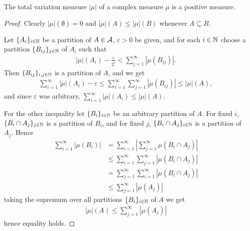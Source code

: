 \documentclass[../../main.tex]{subfiles}
\begin{document}
\begin{theorem}
The total variation measure $|\mu|$ of a complex measure $\mu$ is a positive measure.
\end{theorem}
\begin{proof}
Clearly $|\mu|(\emptyset)=0$ and $|\mu|(A) \le |\mu|(B)$ whenever $A\subseteq B$.

Let $\{A_{i}\}_{i\in \mathbb{N}}$ be a partition of $A\in \mathcal{A}$, $\varepsilon>0$ be given, and for each $i\in \mathbb{N}$ choose a partition $\{B_{ij}\}_{j \in \mathbb{N}}$ of $A_{i}$ such that
\begin{align*}
	|\mu|(A_{i}) - \frac{\varepsilon}{2^{i}} < \sum_{j=1}^{\infty} | \mu(B_{ij}) |.
\end{align*}
Then $\{B_{ij}\}_{i,j\in \mathbb{N}}$ is a partition of $A$, and we get
\begin{align*}
	\sum_{i=1}^{\infty} |\mu|(A_{i}) - \varepsilon \le \sum_{i=1}^{\infty}\sum_{j=1}^{\infty} | \mu(B_{ij}) | \le |\mu|(A),
\end{align*}
and since $\varepsilon$ was arbitrary, $\sum_{i=1}^{\infty} |\mu|(A_{i}) \le |\mu|(A)$.

For the other inequality let $\{B_{i}\}_{i\in \mathbb{N}}$ be an arbitrary partition of $A$. For fixed $i$, $\{B_{i} \cap A_{j}\}_{j\in \mathbb{N}}$ is a partition of $B_{i}$, and for fixed $j$, $\{B_{i} \cap A_{j}\}_{i\in \mathbb{N}}$ is a partition of $A_{j}$. Hence
\begin{align*}
	\sum_{i=1}^{\infty}|\mu(B_{i})| &= \sum_{i=1}^{\infty} \left| \sum_{j=1}^{\infty} \mu(B_{i} \cap A_{j}) \right|\\
	&\le \sum_{i=1}^{\infty} \sum_{j=1}^{\infty} | \mu(B_{i} \cap A_{j}) | \\
	&= \sum_{j=1}^{\infty} \sum_{i=1}^{\infty} | \mu(B_{i} \cap A_{j}) |\\
	&\le \sum_{j=1}^{\infty} |\mu(A_{j})|
\end{align*}
taking the supremum over all partitions $\{B_{i}\}_{i\in \mathbb{N}}$ of $A$ we get
\begin{align*}
	|\mu|(A) \le \sum_{j=1}^{\infty} |\mu(A_{j})|
\end{align*}
hence equality holds.
\end{proof}

\end{document}
